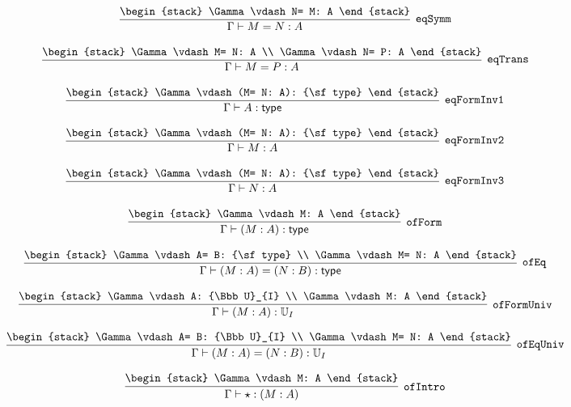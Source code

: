\[
\infer[{\tt eqSymm}]{\Gamma \vdash M= N: A}{
\begin{stack}
\Gamma \vdash N= M: A
\end{stack}}
\]

\[
\infer[{\tt eqTrans}]{\Gamma \vdash M= P: A}{
\begin{stack}
\Gamma \vdash M= N: A
\\
\Gamma \vdash N= P: A
\end{stack}}
\]

\[
\infer[{\tt eqFormInv1}]{\Gamma \vdash A: {\sf type}}{
\begin{stack}
\Gamma \vdash (M= N: A): {\sf type}
\end{stack}}
\]

\[
\infer[{\tt eqFormInv2}]{\Gamma \vdash M: A}{
\begin{stack}
\Gamma \vdash (M= N: A): {\sf type}
\end{stack}}
\]

\[
\infer[{\tt eqFormInv3}]{\Gamma \vdash N: A}{
\begin{stack}
\Gamma \vdash (M= N: A): {\sf type}
\end{stack}}
\]

\[
\infer[{\tt ofForm}]{\Gamma \vdash (M: A): {\sf type}}{
\begin{stack}
\Gamma \vdash M: A
\end{stack}}
\]

\[
\infer[{\tt ofEq}]{\Gamma \vdash (M: A)= (N: B): {\sf type}}{
\begin{stack}
\Gamma \vdash A= B: {\sf type}
\\
\Gamma \vdash M= N: A
\end{stack}}
\]

\[
\infer[{\tt ofFormUniv}]{\Gamma \vdash (M: A): {\Bbb U}_{I}}{
\begin{stack}
\Gamma \vdash A: {\Bbb U}_{I}
\\
\Gamma \vdash M: A
\end{stack}}
\]

\[
\infer[{\tt ofEqUniv}]{\Gamma \vdash (M: A)= (N: B): {\Bbb U}_{I}}{
\begin{stack}
\Gamma \vdash A= B: {\Bbb U}_{I}
\\
\Gamma \vdash M= N: A
\end{stack}}
\]

\[
\infer[{\tt ofIntro}]{\Gamma \vdash \star : (M: A)}{
\begin{stack}
\Gamma \vdash M: A
\end{stack}}
\]

